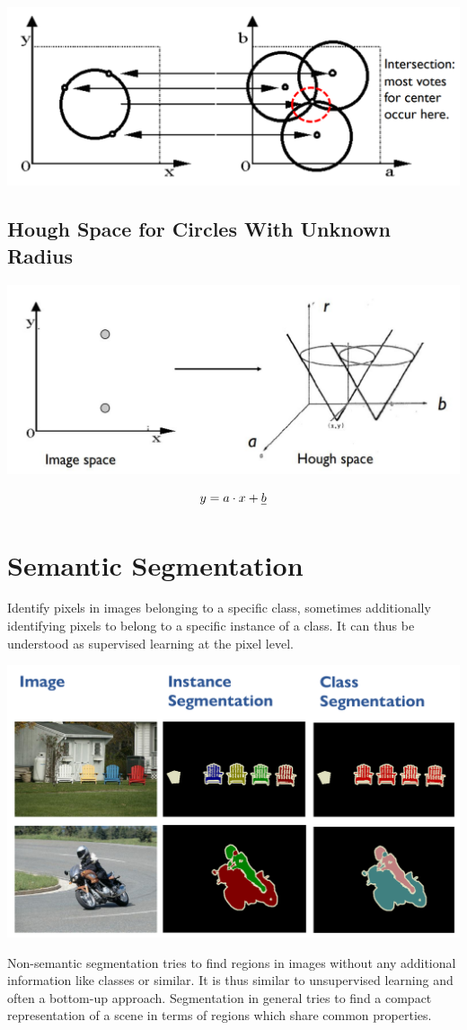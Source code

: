 \documentclass[x11names,11pt,a4paper]{article}
\theoremstyle{definition}
\begin{document}
\begin{center}
	\includegraphics[width=0.7\linewidth]{img/hough_circle_accumulator}
\end{center}

\subsection{Hough Space for Circles With Unknown Radius}

\begin{center}
	\includegraphics[width=0.7\linewidth]{img/hough_circle_accumulator_point}
\end{center}

\begin{equation*}
	y = a\cdot x + \sout{b}
\end{equation*}

\section{Semantic Segmentation}
Identify pixels in images belonging to a specific class, sometimes additionally identifying pixels to belong to a specific instance of a class. It can thus be understood as supervised learning at the pixel level.
\begin{center}
	\includegraphics[width=0.7\linewidth]{img/semantic_segmentation}
\end{center}
Non-semantic segmentation tries to find regions in images without any additional information like classes or similar. It is thus similar to unsupervised learning and often a bottom-up approach. Segmentation in general tries to find a compact representation of a scene in terms of regions which share common properties.
\end{document}
